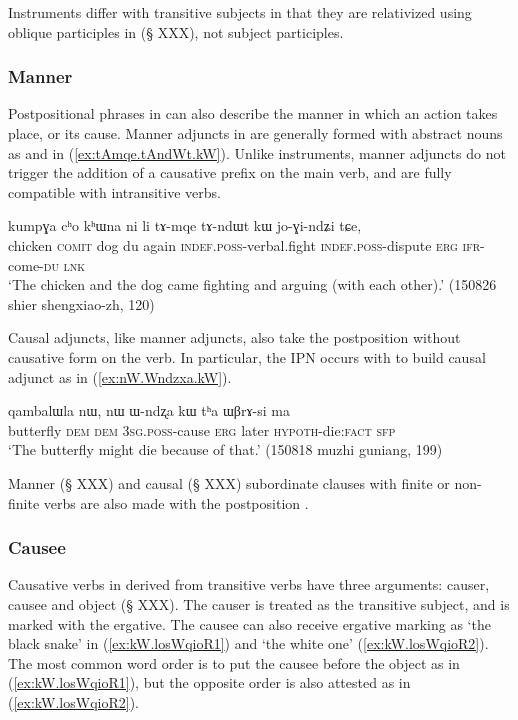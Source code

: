 Instruments differ with transitive subjects in that they are relativized using oblique participles in  (§ XXX), not subject participles.

\subsubsection{Manner} \label{sec:manner.nominal.kW}
Postpositional phrases in  can also describe the manner in which an action takes place, or its cause. Manner adjuncts in  are generally formed with abstract nouns as  and   in (\ref{ex:tAmqe.tAndWt.kW}). Unlike instruments, manner adjuncts do not trigger the addition of a causative prefix on the main verb, and are fully compatible with intransitive verbs.

\begin{exe}
\ex \label{ex:tAmqe.tAndWt.kW}
 \gll kumpɣa cʰo kʰɯna ni li tɤ-mqe tɤ-ndɯt kɯ jo-ɣi-ndʑi tɕe, \\
 chicken \textsc{comit} dog du again \textsc{indef}.\textsc{poss}-verbal.fight \textsc{indef}.\textsc{poss}-dispute \textsc{erg} \textsc{ifr}-come-\textsc{du} \textsc{lnk} \\
 \glt `The chicken and the dog came fighting and arguing (with each other).' (150826 shier shengxiao-zh, 120)
\end{exe}

Causal adjuncts, like manner adjuncts, also take the postposition  without causative form on the verb. In particular, the IPN  occurs with  to build causal adjunct as in (\ref{ex:nW.Wndzxa.kW}). 

\begin{exe}
\ex \label{ex:nW.Wndzxa.kW}
 \gll   qambalɯla nɯ, nɯ ɯ-ndʐa kɯ tʰa ɯβrɤ-si ma \\
 butterfly \textsc{dem} \textsc{dem} \textsc{3sg}.\textsc{poss}-cause \textsc{erg}  later \textsc{hypoth}-die:\textsc{fact} \textsc{sfp} \\
 \glt `The butterfly might die because of that.' (150818 muzhi guniang, 199)
\end{exe}

Manner (§ XXX) and causal (§ XXX) subordinate clauses with finite or non-finite verbs are also made with the postposition .

\subsubsection{Causee} \label{sec:causee.kW}
Causative verbs in  derived from transitive verbs have three arguments: causer, causee and object (§ XXX). The causer is treated as the transitive subject, and is marked with the ergative. The causee can also receive  ergative marking as  `the black snake' in (\ref{ex:kW.losWqioR1}) and  `the white one' (\ref{ex:kW.losWqioR2}). The most common word order is to put the causee before the object as in (\ref{ex:kW.losWqioR1}), but the opposite order is also attested as in (\ref{ex:kW.losWqioR2}).


